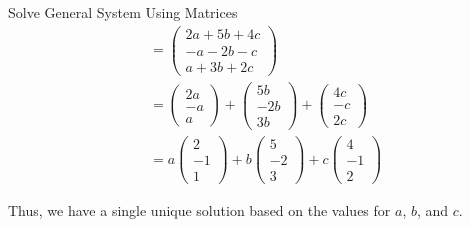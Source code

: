 \begin{example}{Solve General System Using Matrices}
\begin{align*}
    &=
      \begin{pmatrix}
        2a + 5b + 4c \\
        -a - 2b - c \\
        a + 3b + 2c
      \end{pmatrix} \\
        &=
          \begin{pmatrix}
            2a \\
            -a \\
            a
          \end{pmatrix} +
    \begin{pmatrix}
      5b \\
      -2b \\
      3b
    \end{pmatrix} +
    \begin{pmatrix}
      4c \\
      -c \\
      2c
    \end{pmatrix} \\
    &= a
      \begin{pmatrix}
        2 \\
        -1 \\
        1
      \end{pmatrix}
    + b
    \begin{pmatrix}
      5 \\
      -2 \\
      3
    \end{pmatrix}
    + c
    \begin{pmatrix}
      4 \\
      -1 \\
      2
    \end{pmatrix}
  \end{align*}

  Thus, we have a single unique solution based on the values for $a$, $b$, and $c$.
\end{example}


